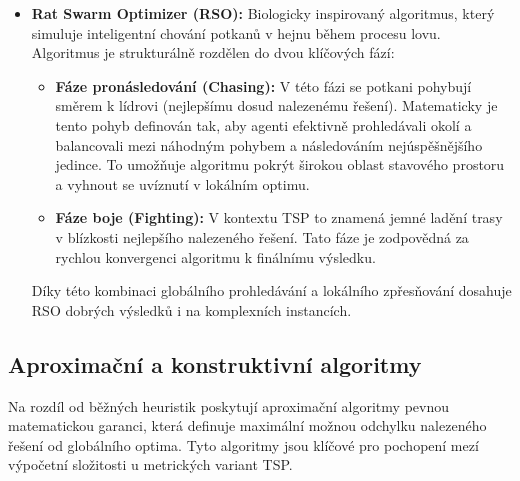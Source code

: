 \begin{itemize}
\item \textbf{Rat Swarm Optimizer (RSO):} Biologicky inspirovaný algoritmus, který simuluje inteligentní chování potkanů v hejnu během procesu lovu. Algoritmus je strukturálně rozdělen do dvou klíčových fází:
\begin{itemize}
    \item \textbf{Fáze pronásledování (Chasing):} V této fázi se potkani pohybují směrem k lídrovi (nejlepšímu dosud nalezenému řešení). Matematicky je tento pohyb definován tak, aby agenti efektivně prohledávali okolí a balancovali mezi náhodným pohybem a následováním nejúspěšnějšího jedince. To umožňuje algoritmu pokrýt širokou oblast stavového prostoru a vyhnout se uvíznutí v lokálním optimu.
    \item \textbf{Fáze boje (Fighting):} V kontextu TSP to znamená jemné ladění trasy v blízkosti nejlepšího nalezeného řešení. Tato fáze je zodpovědná za rychlou konvergenci algoritmu k finálnímu výsledku.
\end{itemize}
Díky této kombinaci globálního prohledávání a lokálního zpřesňování dosahuje RSO dobrých výsledků i na komplexních instancích.
\end{itemize}


\subsection{Aproximační a konstruktivní algoritmy}
Na rozdíl od běžných heuristik poskytují aproximační algoritmy pevnou matematickou garanci, která definuje maximální možnou odchylku nalezeného řešení od globálního optima. %
Tyto algoritmy jsou klíčové pro pochopení mezí výpočetní složitosti u metrických variant TSP.

